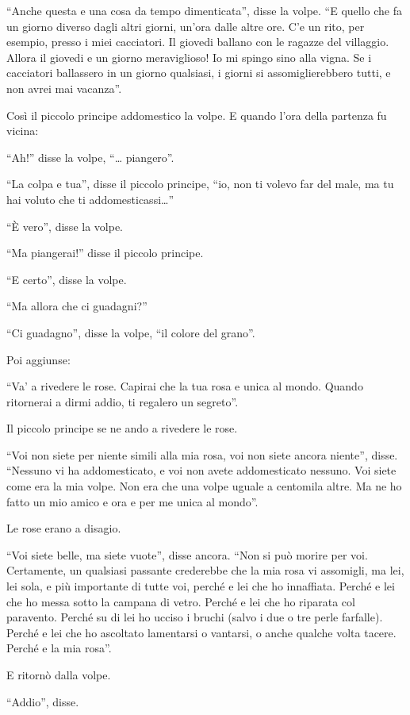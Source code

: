 \documentclass[11pt]{scrbook}
\begin{document}
``Anche questa e una cosa da tempo dimenticata'', disse la volpe. ``E
quello che fa un giorno diverso dagli altri giorni, un'ora dalle altre
ore. C'e un rito, per esempio, presso i miei cacciatori. Il giovedi
ballano con le ragazze del villaggio. Allora il giovedi e un giorno
meraviglioso! Io mi spingo sino alla vigna. Se i cacciatori ballassero
in un giorno qualsiasi, i giorni si assomiglierebbero tutti, e non avrei
mai vacanza''.

Così il piccolo principe addomestico la volpe. E quando l'ora della
partenza fu vicina:

``Ah!'' disse la volpe, ``\ldots{} piangero''.

``La colpa e tua'', disse il piccolo principe, ``io, non ti volevo far
del male, ma tu hai voluto che ti addomesticassi\ldots{}''

``È vero'', disse la volpe.

``Ma piangerai!'' disse il piccolo principe.

``E certo'', disse la volpe.

``Ma allora che ci guadagni?''

``Ci guadagno'', disse la volpe, ``il colore del grano''.

Poi aggiunse:

``Va' a rivedere le rose. Capirai che la tua rosa e unica al mondo.
Quando ritornerai a dirmi addio, ti regalero un segreto''.

Il piccolo principe se ne ando a rivedere le rose.

``Voi non siete per niente simili alla mia rosa, voi non siete ancora
niente'', disse. ``Nessuno vi ha addomesticato, e voi non avete
addomesticato nessuno. Voi siete come era la mia volpe. Non era che una
volpe uguale a centomila altre. Ma ne ho fatto un mio amico e ora e per
me unica al mondo''.

Le rose erano a disagio.

``Voi siete belle, ma siete vuote'', disse ancora. ``Non si può morire
per voi. Certamente, un qualsiasi passante crederebbe che la mia rosa vi
assomigli, ma lei, lei sola, e più importante di tutte voi, perché e lei
che ho innaffiata. Perché e lei che ho messa sotto la campana di vetro.
Perché e lei che ho riparata col paravento. Perché su di lei ho ucciso i
bruchi (salvo i due o tre perle farfalle). Perché e lei che ho ascoltato
lamentarsi o vantarsi, o anche qualche volta tacere. Perché e la mia
rosa''.

E ritornò dalla volpe.

``Addio'', disse.
\end{document}
